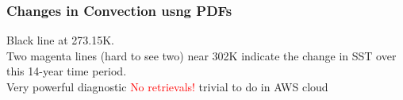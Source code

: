 \documentclass[10pt,t]{beamer}
\begin{document}
\begin{frame}
  \frametitle{Changes in Convection usng PDFs}

  \vspace{-0.4in}

  \begin{figure}
  \hspace*{0.2in}
\end{figure}

Black line at 273.15K.\\
\vspace{0.1in}Two magenta lines (hard to see two) near 302K indicate the
change in SST over this 14-year time period.\\
\vspace{0.1in} Very powerful diagnostic \textcolor{red}{No retrievals!} trivial to do in AWS cloud

\end{frame}
\end{document}
